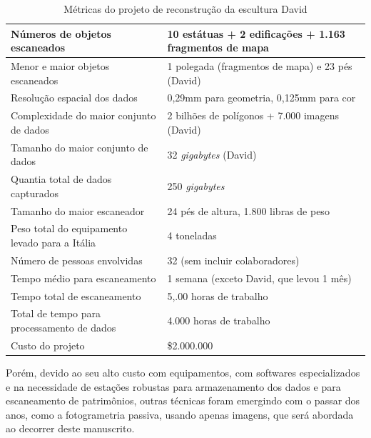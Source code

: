 \begin{table}[!h]
\caption{Métricas do projeto de reconstrução da escultura David}
\label{tab:metricasDavid}
\begin{tabular}{|l|p{4.7cm}|}
\hline
Números de objetos escaneados          & 10 estátuas + 2 edificações + 1.163 fragmentos de mapa  \\ \hline
Menor e maior objetos escaneados       & 1 polegada (fragmentos de mapa) e 23 pés (David)         \\ \hline
Resolução espacial dos dados                & 0,29mm para geometria, 0,125mm para cor              \\ \hline
Complexidade do maior conjunto de dados             & 2 bilhões de polígonos + 7.000 imagens (David)\\ \hline
Tamanho do maior conjunto de dados                    & 32 \emph{gigabytes} (David)                  \\ \hline
Quantia total de dados capturados              & 250 \emph{gigabytes}                                 \\ \hline
Tamanho do maior escaneador                    & 24 pés de altura, 1.800 libras de peso                  \\ \hline
Peso total do equipamento levado para a Itália & 4 toneladas                                              \\ \hline
Número de pessoas envolvidas                  & 32 (sem incluir colaboradores) \\ \hline
Tempo médio para escaneamento              & 1 semana (exceto David, que levou 1 mês)       \\ \hline
Tempo total de escaneamento                 & 5,.00 horas de trabalho                                   \\ \hline
Total de tempo para processamento de dados          & 4.000 horas de trabalho                            \\ \hline
Custo do projeto                          & \$2.000.000                                         \\ \hline
\end{tabular}
\end{table}


Porém, devido ao seu alto custo com equipamentos, com softwares especializados e na
necessidade de estações robustas para armazenamento dos dados e para
escaneamento de patrimônios, outras técnicas foram emergindo com o passar dos
anos, como a fotogrametria passiva, usando apenas imagens, que será abordada ao decorrer deste manuscrito.

% 
